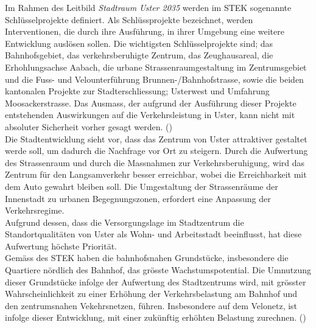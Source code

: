 Im Rahmen des Leitbild \textit{Stadtraum Uster 2035} werden im STEK sogenannte Schlüsselprojekte definiert. Als Schlüssprojekte bezeichnet, werden Interventionen, die durch ihre Ausführung, in ihrer Umgebung eine weitere Entwicklung auslösen sollen. Die wichtigsten Schlüsselprojekte sind; das Bahnhofsgebiet, das verkehrsberuhigte Zentrum, das Zeughausareal, die Erhohlungsachse Aabach, die urbane Strassenraumgestaltung im Zentrumsgebiet und die Fuss- und Velounterführung Brunnen-/Bahnhofstrasse, sowie die beiden kantonalen Projekte zur Stadterschliessung; Usterwest und Umfahrung Moosackerstrasse. Das Ausmass, der aufgrund der Ausführung dieser Projekte entstehenden Auswirkungen auf die Verkehrsleistung in Uster, kann nicht mit absoluter Sicherheit vorher gesagt werden. (\cite{STEK}) \\

Die Stadtentwicklung sieht vor, dass das Zentrum von Uster attraktiver gestaltet werde soll, um dadurch die Nachfrage vor Ort zu steigern. Durch die Aufwertung des Strassenraum und durch die Massnahmen zur Verkehrsberuhigung, wird das Zentrum für den Langsamverkehr besser erreichbar, wobei die Erreichbarkeit mit dem Auto gewahrt bleiben soll. Die Umgestaltung der Strassenräume der Innenstadt zu urbanen Begegnungszonen, erfordert eine Anpassung der Verkehrsregime. \\
Aufgrund dessen, dass die Versorgungslage im Stadtzentrum die Standortqualitäten von Uster als Wohn- und Arbeitsstadt beeinflusst, hat diese Aufwertung höchste Priorität. \\
Gemäss des STEK haben die bahnhofsnahen Grundstücke, insbesondere die Quartiere nördlich des Bahnhof, das grösste Wachstumspotential. Die Umnutzung dieser Grundstücke infolge der Aufwertung des Stadtzentrums wird, mit grösster Wahrscheinlichkeit zu einer Erhöhung der Verkehrsbelastung am Bahnhof und den zentrumsnahen Vekehrsnetzen, führen. Insbesondere auf dem Velonetz, ist infolge dieser Entwicklung, mit einer zukünftig erhöhten Belastung zurechnen. 
(\cite{STEK})

\pagebreak

